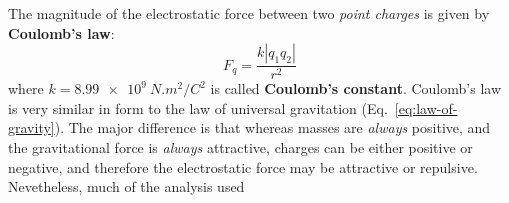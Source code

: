\begin{center}
\end{center}
The magnitude of the electrostatic force between two \emph{point charges} is
given by \textbf{Coulomb's law}:
\begin{equation}
  \boxed{
    F_q=\frac{k\left|q_1q_2\right|}{r^2}
  }
\end{equation}
where $k=\SI{8.99e9}{N.m^2/C^2}$ is called \textbf{Coulomb's constant}.
Coulomb's law is very similar in form to the law of universal gravitation
(Eq.~\ref{eq:law-of-gravity}). The major difference is that whereas masses are
\emph{always} positive, and the gravitational force is \emph{always} attractive,
charges can be either positive or negative, and therefore the electrostatic
force may be attractive or repulsive. Nevetheless, much of the analysis used





%
%    
%
%  



